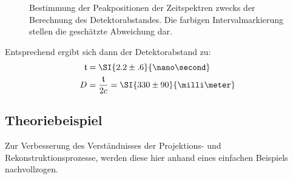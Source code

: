 \documentclass[slug=PET, room=Andreas-Schubert-Bau\,\ 424A, supervisor=Carsten\ Bittrich, coursedate=10.\ 01.\ 2020]{../../Lab_Report_LaTeX/lab_report}
\begin{document}
\begin{figure}[H]\centering
  
  \caption[Abstandsbestimmung]{Bestimmung der Peakpositionen der Zeitspektren zwecks der
    Berechnung des Detektorabstandes. Die farbigen Intervalmarkierung
    stellen die gesch\"atzte Abweichung dar.}
  \label{fig:calibration-lenght_det}
\end{figure}

Entsprechend ergibt sich dann der Detektorabstand zu:
\begin{align}
  \label{eq:abst}
  \mathfrak{t} &= \SI{2.2\pm .6}{\nano\second} \\
  D &= \frac{\mathfrak{t}}{2c} = \SI{330\pm 90}{\milli\meter}
\end{align}

\subsection{Theoriebeispiel}
\label{sec:theobei}
Zur Verbesserung des Verst\"andnisses der Projektions- und
Rekonstruktionsprozesse, werden diese hier anhand eines einfachen
Beispiels nachvollzogen.
\end{document}
